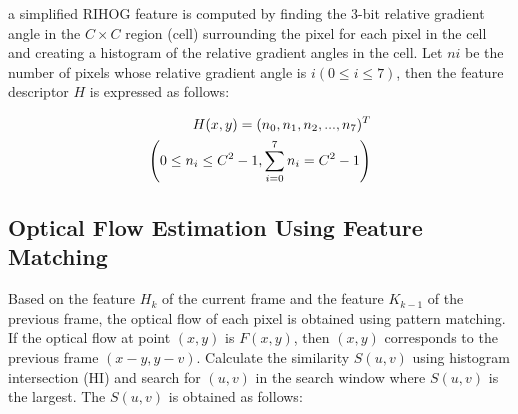 

a simplified RIHOG feature is computed by finding the 3-bit relative gradient angle
in the $C \times C$ region (cell) surrounding the pixel for each pixel
in the cell and creating a histogram of the relative gradient angles in the cell.
Let $ni$ be the number of pixels whose relative gradient angle is $i(0 \leq i \leq 7)$,
then the feature descriptor $H$ is expressed as follows:

\begin{align}
  \label{equation:equ_RIHOG}
  H(x,y) = (n_0,n_1,n_2,...,n_7)^T \\
  \left(  0 \leq n_i \leq C^2 -1 , \sum_{i=0}^{7}n_i = C^2 -1  \right) \notag
\end{align}



\subsection{Optical Flow Estimation Using Feature Matching}\label{label:estimation}



Based on the feature $H_k$ of the current frame and the feature $K_{k-1}$ of the previous frame,
the optical flow of each pixel is obtained using pattern matching.
If the optical flow at point $(x,y)$ is $F(x,y)$,
then $(x,y)$ corresponds to the previous frame $(x-y,y-v)$.
Calculate the similarity $S(u,v)$ using histogram intersection (HI)
and search for $(u,v)$ in the search window where $S(u,v)$ is the largest.
The $S(u,v)$ is obtained as follows:



